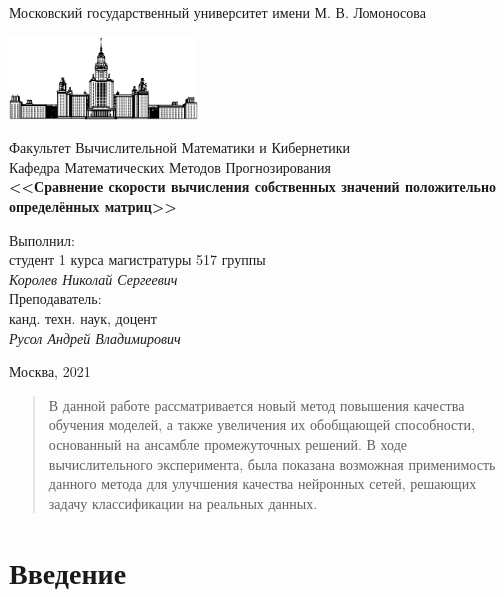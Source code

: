\documentclass[12pt, fleqn]{article}
\begin{document}
\begin{titlepage}
\begin{center}
    Московский государственный университет имени М. В. Ломоносова

    \bigskip
    \includegraphics[width=50mm]{msu.eps}

    \bigskip
    Факультет Вычислительной Математики и Кибернетики\\
    Кафедра Математических Методов Прогнозирования\\[10mm]

    \textsf{\large\bfseries
        <<Сравнение скорости вычисления собственных значений положительно определённых матриц>>
    }\\[20mm]

    \begin{flushright}
        \parbox{0.5\textwidth}{
            Выполнил:\\
            студент 1 курса магистратуры 517 группы\\
            \emph{Королев Николай Сергеевич}\\[5mm]
            Преподаватель:\\
            канд. техн. наук, доцент\\
            \emph{Русол Андрей Владимирович}
        }
    \end{flushright}

    \vspace{\fill}
    Москва, 2021
\end{center}
\end{titlepage}

\newpage
\renewcommand{\contentsname}{Содержание}
\tableofcontents

\newpage
\begin{abstract}
    В данной работе рассматривается новый метод повышения качества обучения моделей, а также увеличения их обобщающей способности, основанный на ансамбле промежуточных решений. В ходе вычислительного эксперимента, была показана возможная применимость данного метода для улучшения качества нейронных сетей, решающих задачу классификации на реальных данных.
\end{abstract}

\newpage
\section{Введение}
\end{document}
